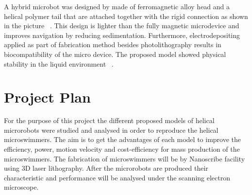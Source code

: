 \documentclass[a4paper,11pt]{article}
\begin{document}
\begin{sloppypar}

A hybrid microbot was designed by \citeauthor{zeeshan2013hybrid} made of ferromagnetic alloy
 head and a helical polymer tail that are attached together with the rigid connection as shown in
 the picture ~\citep{zeeshan2013hybrid}. This design is lighter than the fully magnetic microdevice and improves 
navigation by reducing sedimentation. Furthermore, electrodepositing applied as part of fabrication 
method besides photolithography results in biocompatibility of the micro device. 
The proposed model showed physical stability in the liquid environment ~\citep{zeeshan2013hybrid}. 



\section{Project Plan}
For the purpose of this project the different proposed models of helical microrobots were studied
 and analysed in order to reproduce the helical microswimmers. The aim is to get the advantages of
 each model to improve the efficiency, power, motion velocity and cost-efficiency for mass production
 of the microswimmers. The fabrication of microswimmers will be by Nanoscribe facility using 3D laser
 lithography. After the microrobots are produced their characteristic and performance will be analysed
 under the scanning electron microscope.




\balance

\nocite{laxmi2006human}
\nocite{riviere2006robotic}




\end{sloppypar}
\end{document}
